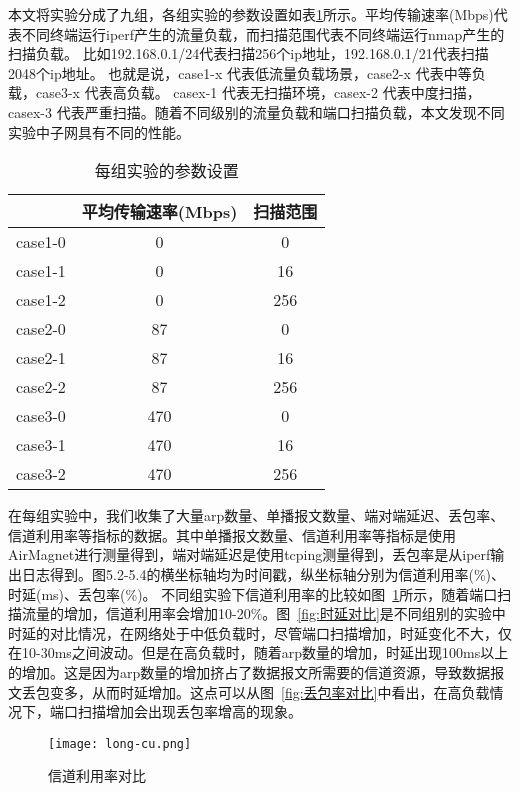   本文将实验分成了九组，各组实验的参数设置如表\ref{每组实验的参数设置}所示。平均传输速率(Mbps)代表不同终端运行iperf产生的流量负载，而扫描范围代表不同终端运行nmap产生的扫描负载。 比如192.168.0.1/24代表扫描256个ip地址，192.168.0.1/21代表扫描2048个ip地址。 也就是说，case1-x 代表低流量负载场景，case2-x 代表中等负载，case3-x 代表高负载。 casex-1 代表无扫描环境，casex-2 代表中度扫描，casex-3 代表严重扫描。随着不同级别的流量负载和端口扫描负载，本文发现不同实验中子网具有不同的性能。 

\begin{table}[htb]
  \centering
  \caption{每组实验的参数设置}
  \label{每组实验的参数设置}
      \begin{tabular}{c|cc}
      \toprule  %
       &平均传输速率(Mbps)&扫描范围\\
      \hline  %
      case1-0& 0 & 0\\
      \hline %
      case1-1& 0 & 16\\
      \hline  %
      case1-2& 0 & 256\\
      \hline %
      case2-0& 87 & 0\\
      \hline %
      case2-1& 87 & 16\\
      \hline  %
      case2-2& 87 & 256\\
      \hline %
      case3-0&470 & 0\\
      \hline %
      case3-1& 470 & 16\\
      \hline  %
      case3-2& 470 & 256\\
      \bottomrule %
      \end{tabular}
\end{table}



在每组实验中，我们收集了大量arp数量、单播报文数量、端对端延迟、丢包率、信道利用率等指标的数据。其中单播报文数量、信道利用率等指标是使用AirMagnet\cite{airmagnet}进行测量得到，端对端延迟是使用tcping测量得到，丢包率是从iperf输出日志得到。图5.2-5.4的横坐标轴均为时间戳，纵坐标轴分别为信道利用率(\%)、时延(ms)、丢包率(\%)。
不同组实验下信道利用率的比较如图~\ref{fig:信道利用率对比}所示，随着端口扫描流量的增加，信道利用率会增加10-20\%。图~\ref{fig:时延对比}是不同组别的实验中时延的对比情况，在网络处于中低负载时，尽管端口扫描增加，时延变化不大，仅在10-30ms之间波动。但是在高负载时，随着arp数量的增加，时延出现100ms以上的增加。这是因为arp数量的增加挤占了数据报文所需要的信道资源，导致数据报文丢包变多，从而时延增加。这点可以从图~\ref{fig:丢包率对比}中看出，在高负载情况下，端口扫描增加会出现丢包率增高的现象。
\begin{figure}
  \centering
  \texttt{[image: long-cu.png]}
  \caption{信道利用率对比}
  \label{fig:信道利用率对比}
\end{figure}

